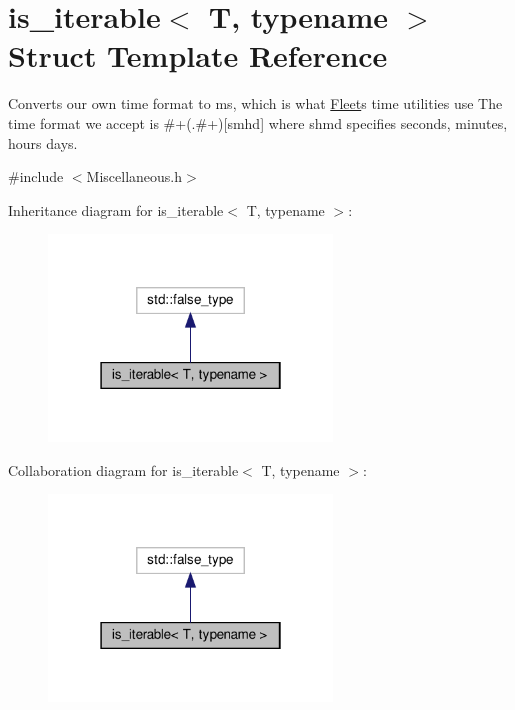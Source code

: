 \hypertarget{structis__iterable}{}\section{is\+\_\+iterable$<$ T, typename $>$ Struct Template Reference}
\label{structis__iterable}


Converts our own time format to ms, which is what \hyperlink{namespace_fleet}{Fleet}\textquotesingle{}s time utilities use The time format we accept is \#+(.\#+)\mbox{[}smhd\mbox{]} where shmd specifies seconds, minutes, hours days.  




{\ttfamily \#include $<$Miscellaneous.\+h$>$}



Inheritance diagram for is\+\_\+iterable$<$ T, typename $>$\+:\nopagebreak
\begin{figure}[H]
\begin{center}
\leavevmode
\includegraphics[width=214pt]{structis__iterable__inherit__graph}
\end{center}
\end{figure}


Collaboration diagram for is\+\_\+iterable$<$ T, typename $>$\+:\nopagebreak
\begin{figure}[H]
\begin{center}
\leavevmode
\includegraphics[width=214pt]{structis__iterable__coll__graph}
\end{center}
\end{figure}


